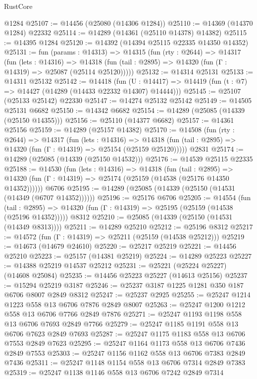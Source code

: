 \begin{lexlean}{RustCore}
\begin{coremodule}
    @1284
@25107 := @14456 (@25080 (@14306 @1284))
@25110 := @14369 (@14370 @1284) @22332
@25114 := @14289 (@14361 (@25110 @14378) @14382)
@25115 := @14395 @1284
@25120 := @14392 (@14394 @25115 @22335 @14350 @14352)
@25131 := fun (params : @14313) =>
  @14315
    (fun (rty : @2644) =>
    @14317
      (fun (lets : @14316) =>
      @14318 (fun (tail : @2895) => @14320 (fun (Γ : @14319) => @25087 (@25114 @25120)))))
@25132 := @14314 @25131
@25133 := @14311 @25132
@25142 := @14418
    (fun (U : @14417) => @14419 (fun (t : @7) => @14427 (@14289 (@14433 @22332 @14307) @14444)))
@25145 := @25107 (@25133 @25142) @22330
@25147 := @14274 @25132 @25142
@25149 := @14505 @25131 @6682
@25150 := @14342 @6682
@25154 := @14289 (@25085 (@14339 (@25150 @14355)))
@25156 := @25110 (@14377 @6682)
@25157 := @14361 @25156
@25159 := @14289 (@25157 @14382)
@25170 := @14508
    (fun (rty : @2644) =>
    @14317
      (fun (lets : @14316) =>
      @14318 (fun (tail : @2895) => @14320 (fun (Γ : @14319) => @25154 (@25159 @25120)))))
    @2831
@25174 := @14289 (@25085 (@14339 (@25150 @14532)))
@25176 := @14539 @25115 @22335
@25188 := @14530
    (fun (lets : @14316) =>
    @14318
      (fun (tail : @2895) =>
      @14320 (fun (Γ : @14319) => @25174 (@25159 (@14538 (@25176 @14350 @14352))))))
    @6706
@25195 := @14289 (@25085 (@14339 (@25150 (@14531 (@14349 (@6707 @14352))))))
@25196 := @25176 @6706
@25205 := @14554
    (fun (tail : @2895) => @14320 (fun (Γ : @14319) => @25195 (@25159 (@14538 (@25196 @14352)))))
    @8312
@25210 := @25085 (@14339 (@25150 (@14531 (@14349 @8313))))
@25211 := @14289 @25210
@25212 := @25196 @8312
@25217 := @14572 (fun (Γ : @14319) => @25211 (@25159 (@14538 @25212)))
@25219 := @14673 (@14679 @24610)
@25220 := @25217 @25219
@25221 := @14456 @25210
@25223 := @25157 (@14381 @25219)
@25224 := @14289 @25223
@25227 := @14388 @25219 @14537 @25212
@25231 := @25221 (@25224 @25227) (@14608 @25084)
@25235 := @14456 @25223 @25227 (@14613 @25156)
@25237 := @15294 @25219 @3187
@25246 := @25237 @3187 @1225 @1281 @350 @187 @6706 @8007 @2849 @8312
@25247 := @25237 @2925
@25255 := @25247 @1214 @1223 @558 @13 @6706 @7876 @2849 @8007
@25263 := @25247 @1200 @1212 @558 @13 @6706 @7766 @2849 @7876
@25271 := @25247 @1193 @1198 @558 @13 @6706 @7693 @2849 @7766
@25279 := @25247 @1185 @1191 @558 @13 @6706 @7623 @2849 @7693
@25287 := @25247 @1175 @1183 @558 @13 @6706 @7553 @2849 @7623
@25295 := @25247 @1164 @1173 @558 @13 @6706 @7436 @2849 @7553
@25303 := @25247 @1156 @1162 @558 @13 @6706 @7383 @2849 @7436
@25311 := @25247 @1148 @1154 @558 @13 @6706 @7314 @2849 @7383
@25319 := @25247 @1138 @1146 @558 @13 @6706 @7242 @2849 @7314

\end{coremodule}
\end{lexlean}
